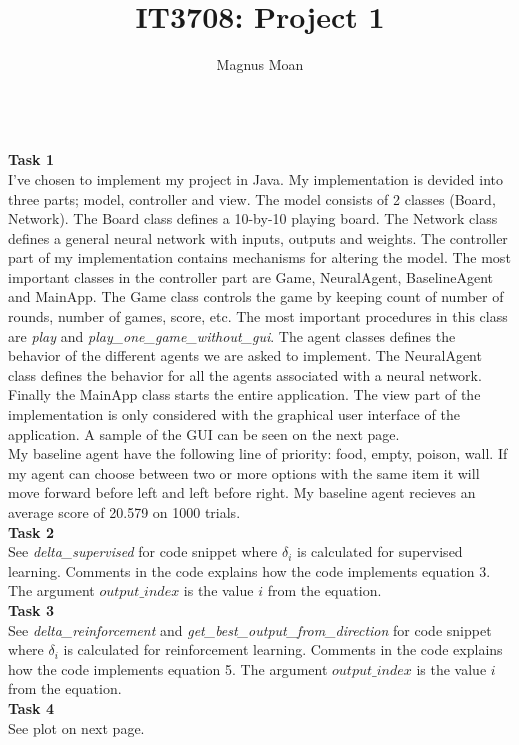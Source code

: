 \documentclass{article}
\author{Magnus Moan}
\title{IT3708: Project 1}
\begin{document}
\maketitle

\hfill\\
\noindent
\textbf{Task 1} \\
I've chosen to implement my project in Java. My implementation is devided into three parts; model, controller and view. 
The model consists of 2 classes ({Board}, {Network}). 
The {Board} class defines a 10-by-10 playing board. The {Network} class defines a general neural network with inputs, outputs and weights. 
The controller part
of my implementation contains mechanisms for altering the model. The most important classes in the controller part are {Game}, {NeuralAgent}, {BaselineAgent} and
{MainApp}. The {Game} class controls the game by keeping count of number of rounds, number of games, score, etc. The most important procedures in this class are
\textit{play} and \textit{play\_one\_game\_without\_gui}. The agent classes defines the behavior of the different agents we are asked to implement. The {NeuralAgent} class
defines the behavior for all the agents associated with a neural network. Finally the {MainApp} class starts the entire application. 
The view part of the implementation is only considered with the graphical user interface of the application. A sample of the GUI can be seen on the next page.
\\[1ex]
My baseline agent have the following line of priority: food, empty, poison, wall. If my agent can choose between two or more options with the same item it will move forward before left
and left before right. My baseline agent recieves an average score of 20.579 on 1000 trials.
\\[1.5ex]
\textbf{Task 2} \\
See \textit{delta\_supervised} for code snippet where $\delta_i$ is calculated for supervised learning.
Comments in the code explains how the code implements equation 3. The argument $output\_index$ is the value $i$ from the equation.
\\[1.5ex]
\textbf{Task 3} \\
See \textit{delta\_reinforcement} and \textit{get\_best\_output\_from\_direction} for code snippet where $\delta_i$ is calculated for reinforcement learning.
Comments in the code explains how the code implements equation 5. The argument $output\_index$ is the value $i$ from the equation.
\\[1.5ex]
\textbf{Task 4} \\
See plot on next page. \\
\end{document}
